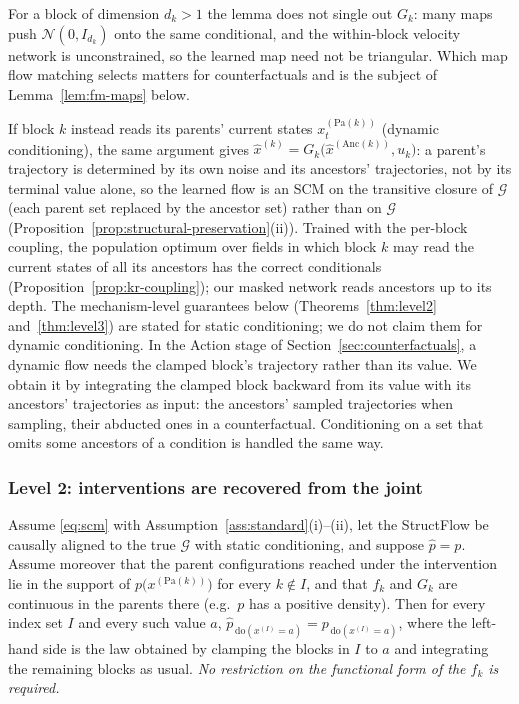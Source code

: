 For a block of dimension $d_k > 1$ the lemma does not single out $G_k$: many maps push
$\mathcal{N}(0, I_{d_k})$ onto the same conditional, and the within-block velocity network
is unconstrained, so the learned map need not be triangular. Which map flow matching
selects matters for counterfactuals and is the subject of Lemma~\ref{lem:fm-maps} below.

\begin{remark}
\label{rem:static-dynamic-equal}
If block $k$ instead reads its parents' current states $x^{(\mathrm{Pa}(k))}_t$ (dynamic
conditioning), the same argument gives
$\hat x^{(k)} = G_k\bigl(\hat x^{(\mathrm{Anc}(k))}, u_k\bigr)$: a parent's trajectory is
determined by its own noise and its ancestors' trajectories, not by its terminal value
alone, so the learned flow is an SCM on the transitive closure of $\mathcal{G}$ (each parent set
replaced by the ancestor set) rather than on $\mathcal{G}$
(Proposition~\ref{prop:structural-preservation}(ii)). Trained with the per-block coupling, the
population optimum over fields in which block $k$ may read the current states of all its
ancestors has the correct conditionals (Proposition~\ref{prop:kr-coupling}); our masked
network reads ancestors up to its depth. The mechanism-level guarantees below
(Theorems~\ref{thm:level2} and~\ref{thm:level3}) are stated for static conditioning; we do
not claim them for dynamic conditioning. In the Action stage of
Section~\ref{sec:counterfactuals}, a dynamic flow needs the clamped block's trajectory rather
than its value. We obtain it by integrating the clamped block backward from its value with its
ancestors' trajectories as input: the ancestors' sampled trajectories when sampling, their
abducted ones in a counterfactual. Conditioning on a set that omits some ancestors of a
condition is handled the same way.
\end{remark}

\subsubsection{Level 2: interventions are recovered from the joint}

\begin{theorem}
\label{thm:level2}
Assume \eqref{eq:scm} with Assumption~\ref{ass:standard}(i)--(ii), let the
StructFlow be causally aligned to the true $\mathcal{G}$ with static conditioning, and
suppose $\hat p = p$. Assume moreover that the parent configurations reached under the
intervention lie in the support of $p\bigl(x^{(\mathrm{Pa}(k))}\bigr)$ for every $k \notin I$,
and that $f_k$ and $G_k$ are continuous in the parents there (e.g.\ $p$ has a positive
density). Then for every index set $I$ and every such value $a$,
$\hat p_{\,\mathrm{do}(x^{(I)}=a)} = p_{\,\mathrm{do}(x^{(I)}=a)}$, where the left-hand side
is the law obtained by clamping the blocks in $I$ to $a$ and integrating the remaining blocks
as usual. \emph{No restriction on the functional form of the $f_k$ is required.}
\end{theorem}

